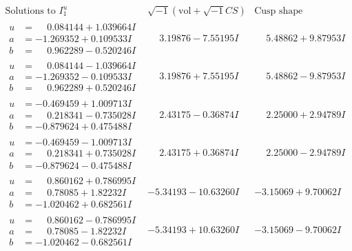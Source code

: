 \documentclass[1p]{elsarticle_modified}
\theoremstyle{definition}
\newcommand{\I}{\sqrt{-1}}
\begin{document}
$$\begin{array}{c|c|c}  
\text{Solutions to }I^u_{1}& \I (\text{vol} + \sqrt{-1}CS) & \text{Cusp shape}\\
 \hline 
\begin{aligned}
u &= \phantom{-}0.084144 + 1.039664 I \\
a &= -1.269352 + 0.109533 I \\
b &= \phantom{-}0.962289 - 0.520246 I\end{aligned}
 & \phantom{-}3.19876 - 7.55195 I & \phantom{-}5.48862 + 9.87953 I \\ \hline\begin{aligned}
u &= \phantom{-}0.084144 - 1.039664 I \\
a &= -1.269352 - 0.109533 I \\
b &= \phantom{-}0.962289 + 0.520246 I\end{aligned}
 & \phantom{-}3.19876 + 7.55195 I & \phantom{-}5.48862 - 9.87953 I \\ \hline\begin{aligned}
u &= -0.469459 + 1.009713 I \\
a &= \phantom{-}0.218341 - 0.735028 I \\
b &= -0.879624 + 0.475488 I\end{aligned}
 & \phantom{-}2.43175 - 0.36874 I & \phantom{-}2.25000 + 2.94789 I \\ \hline\begin{aligned}
u &= -0.469459 - 1.009713 I \\
a &= \phantom{-}0.218341 + 0.735028 I \\
b &= -0.879624 - 0.475488 I\end{aligned}
 & \phantom{-}2.43175 + 0.36874 I & \phantom{-}2.25000 - 2.94789 I \\ \hline\begin{aligned}
u &= \phantom{-}0.860162 + 0.786995 I \\
a &= \phantom{-}0.78085 + 1.82232 I \\
b &= -1.020462 + 0.682561 I\end{aligned}
 & -5.34193 - 10.63260 I & -3.15069 + 9.70062 I \\ \hline\begin{aligned}
u &= \phantom{-}0.860162 - 0.786995 I \\
a &= \phantom{-}0.78085 - 1.82232 I \\
b &= -1.020462 - 0.682561 I\end{aligned}
 & -5.34193 + 10.63260 I & -3.15069 - 9.70062 I \\ \hline\begin{aligned}

\end{aligned}
\end{array}$$
\end{document}
